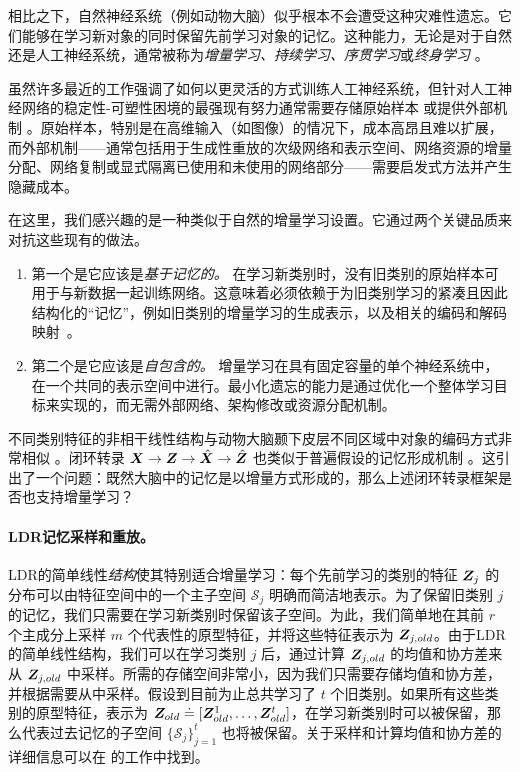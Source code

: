 \documentclass[../../book-main_zh.tex]{subfiles}
\begin{document}
相比之下，自然神经系统（例如动物大脑）似乎根本不会遭受这种灾难性遗忘。它们能够在学习新对象的同时保留先前学习对象的记忆。这种能力，无论是对于自然还是人工神经系统，通常被称为{\em 增量学习、持续学习、序贯学习}或{\em 终身学习} \cite{controlled-forgetting}。



虽然许多最近的工作强调了如何以更灵活的方式训练人工神经系统，但针对人工神经网络的稳定性-可塑性困境的最强现有努力通常需要存储原始样本 \cite{icarl,chaudhry2019tiny} 或提供外部机制 \cite{EWC}。原始样本，特别是在高维输入（如图像）的情况下，成本高昂且难以扩展，而外部机制——通常包括用于生成性重放的次级网络和表示空间、网络资源的增量分配、网络复制或显式隔离已使用和未使用的网络部分——需要启发式方法并产生隐藏成本。


在这里，我们感兴趣的是一种类似于自然的增量学习设置。它通过两个关键品质来对抗这些现有的做法。
\begin{enumerate}
    \item 第一个是它应该是\emph{基于记忆的。} 在学习新类别时，没有旧类别的原始样本可用于与新数据一起训练网络。这意味着必须依赖于为旧类别学习的紧凑且因此结构化的“记忆”，例如旧类别的增量学习的生成表示，以及相关的编码和解码映射~\cite{fearnet}。
    \item 第二个是它应该是\emph{自包含的。} 增量学习在具有固定容量的单个神经系统中，在一个共同的表示空间中进行。最小化遗忘的能力是通过优化一个整体学习目标来实现的，而无需外部网络、架构修改或资源分配机制。
\end{enumerate}

不同类别特征的非相干线性结构与动物大脑颞下皮层不同区域中对象的编码方式非常相似 \cite{Chang-Cell-2017,Bao2020AMO}。闭环转录 $\bm{X} \rightarrow \bm{Z} \rightarrow \hat{\bm{X}} \rightarrow \hat{\bm{Z}}$ 也类似于普遍假设的记忆形成机制 \cite{2020Vandeven,Josselyn2020MemoryER}。这引出了一个问题：既然大脑中的记忆是以增量方式形成的，那么上述闭环转录框架是否也支持增量学习？

\paragraph{LDR记忆采样和重放。} LDR的简单线性{\em 结构}使其特别适合增量学习：每个先前学习的类别的特征 $\bm{Z}_j$ 的分布可以由特征空间中的一个主子空间 $\mathcal{S}_j$ 明确而简洁地表示。为了保留旧类别 $j$ 的记忆，我们只需要在学习新类别时保留该子空间。为此，我们简单地在其前 $r$ 个主成分上采样 $m$ 个代表性的原型特征，并将这些特征表示为 $\bm{Z}_{j,old}$。由于LDR的简单线性结构，我们可以在学习类别 $j$ 后，通过计算 $\bm{Z}_{j,old}$ 的均值和协方差来从 $\bm{Z}_{j,old}$ 中采样。所需的存储空间非常小，因为我们只需要存储均值和协方差，并根据需要从中采样。假设到目前为止总共学习了 $t$ 个旧类别。如果所有这些类别的原型特征，表示为 $\bm{Z}_{old} \doteq [\bm{Z}^1_{old},\ldots, \bm{Z}^t_{old}]$，在学习新类别时可以被保留，那么代表过去记忆的子空间 $\{\mathcal{S}_j\}_{j=1}^t$ 也将被保留。关于采样和计算均值和协方差的详细信息可以在 \cite{tong2023incremental} 的工作中找到。
\end{document}
